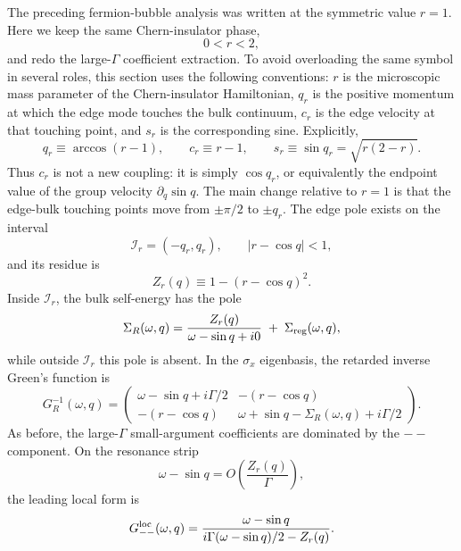 \documentclass[aps,prx,preprint,amsmath,amssymb]{revtex4-2}
\begin{document}
The preceding fermion-bubble analysis was written at the symmetric value
\(r=1\).  Here we keep the same Chern-insulator phase,
\begin{equation}
0<r<2,
\end{equation}
and redo the large-\(\Gamma\) coefficient extraction.  To avoid overloading the
same symbol in several roles, this section uses the following conventions:
\(r\) is the microscopic mass parameter of the Chern-insulator Hamiltonian,
\(q_r\) is the positive momentum at which the edge mode touches the bulk
continuum, \(c_r\) is the edge velocity at that touching point, and \(s_r\) is
the corresponding sine.  Explicitly,
\begin{equation}
q_r\equiv \arccos(r-1),
\qquad
c_r\equiv r-1,
\qquad
s_r\equiv \sin q_r=\sqrt{r(2-r)}.
\end{equation}
Thus \(c_r\) is not a new coupling: it is simply
\(\cos q_r\), or equivalently the endpoint value of the group velocity
\(\partial_q\sin q\).  The main change relative to \(r=1\) is that the
edge-bulk touching points move from \(\pm\pi/2\) to \(\pm q_r\).
The edge pole exists on the interval
\begin{equation}
\mathcal I_r=(-q_r,q_r),
\qquad
|r-\cos q|<1,
\end{equation}
and its residue is
\begin{equation}
Z_r(q)\equiv 1-(r-\cos q)^2.
\end{equation}
Inside \(\mathcal I_r\), the bulk self-energy has the pole
\begin{equation}
\Sigma_R(\omega,q)
=
\frac{Z_r(q)}{\omega-\sin q+i0}
\;+\;
\Sigma_{\rm reg}(\omega,q),
\end{equation}
while outside \(\mathcal I_r\) this pole is absent.  In the \(\sigma_x\)
eigenbasis, the retarded inverse Green's function is
\begin{equation}
G_R^{-1}(\omega,q)
=
\begin{pmatrix}
\omega-\sin q+i\Gamma/2 & -(r-\cos q)\\
-(r-\cos q) & \omega+\sin q-\Sigma_R(\omega,q)+i\Gamma/2
\end{pmatrix}.
\end{equation}
As before, the large-\(\Gamma\) small-argument coefficients are dominated by the
\(--\) component.  On the resonance strip
\begin{equation}
\omega-\sin q=O\!\left(\frac{Z_r(q)}{\Gamma}\right),
\end{equation}
the leading local form is
\begin{equation}
\label{eq:Gmm-local-generic-r}
G_{--}^{\rm loc}(\omega,q)
=
\frac{\omega-\sin q}
{i\Gamma(\omega-\sin q)/2-Z_r(q)}.
\end{equation}
\end{document}

